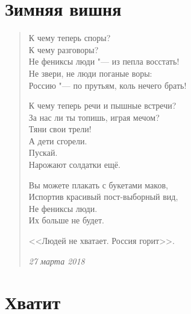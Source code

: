 \documentclass[a4paper,12pt]{article}
\begin{document}
\section{Зимняя вишня}

\begin{verse}

К чему теперь споры?\\
К чему разговоры?\\
Не фениксы люди "--- из пепла восстать!\\
Не звери, не люди поганые воры:\\
Россию "--- по прутьям, коль нечего брать!

К чему теперь речи и пышные встречи?\\
За нас ли ты топишь, играя мечом?\\
Тяни свои трели!\\
А дети сгорели.\\
Пускай.\\
Нарожают солдатки ещё.

Вы можете плакать с букетами маков,\\
Испортив красивый пост-выборный вид,\\
Не фениксы люди.\\
Их больше не будет.

<<Людей не хватает. Россия горит>>.

\emph{27 марта 2018}
\end{verse}
\newpage
\section{Хватит}
\end{document}

